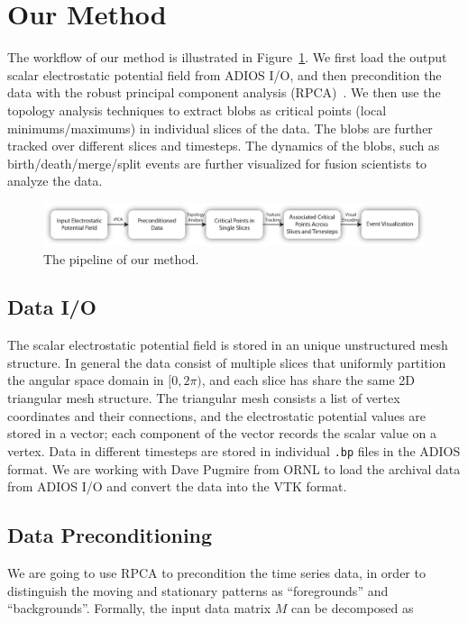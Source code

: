 \section{Our Method}

The workflow of our method is illustrated in Figure~\ref{fig:pipeline}.  
We first load the output scalar electrostatic potential field from ADIOS I/O, and then precondition the data with the robust principal component analysis (RPCA)~\cite{CandesLMW11}.  We then use the topology analysis techniques to extract blobs as critical points (local minimums/maximums) in individual slices of the data.  The blobs are further tracked over different slices and timesteps.  The dynamics of the blobs, such as birth/death/merge/split events are further visualized for fusion scientists to analyze the data.  

\begin{figure}[!h]
  \centering
  \includegraphics[width=\linewidth]{Figs/pipeline}
  \caption{The pipeline of our method.}
  \label{fig:pipeline}
\end{figure}


\subsection{Data I/O}

The scalar electrostatic potential field is stored in an unique unstructured mesh structure.  In general the data consist of multiple slices that uniformly partition the angular space domain in $[0, 2\pi)$, and each slice has share the same 2D triangular mesh structure.  The triangular mesh consists a list of vertex coordinates and their connections, and the electrostatic potential values are stored in a vector; each component of the vector records the scalar value on a vertex.  Data in different timesteps are stored in individual \texttt{.bp} files in the ADIOS format.  We are working with Dave Pugmire from ORNL to load the archival data from ADIOS I/O and convert the data into the VTK format.  


\subsection{Data Preconditioning}
We are going to use RPCA to precondition the time series data, in order to distinguish the moving and stationary patterns as ``foregrounds'' and ``backgrounds''.  Formally, the input data matrix $M$ can be decomposed as 

